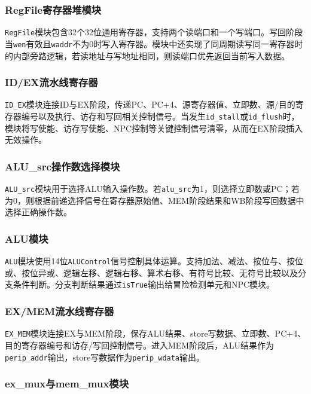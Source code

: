 \documentclass[UTF8,a4paper,12pt]{ctexart}
\newcommand{\code}[1]{\texttt{#1}}
\begin{document}
\subsubsection{RegFile寄存器堆模块}

\code{RegFile}模块包含32个32位通用寄存器，支持两个读端口和一个写端口。写回阶段当\code{wen}有效且\code{waddr}不为0时写入寄存器。模块中还实现了同周期读写同一寄存器时的内部旁路逻辑，若读地址与写地址相同，则读端口优先返回当前写入数据。

\subsubsection{ID/EX流水线寄存器}

\code{ID\_EX}模块连接ID与EX阶段，传递PC、PC+4、源寄存器值、立即数、源/目的寄存器编号以及执行、访存和写回相关控制信号。当发生\code{id\_stall}或\code{id\_flush}时，模块将写使能、访存写使能、NPC控制等关键控制信号清零，从而在EX阶段插入无效操作。

\subsubsection{ALU\_src操作数选择模块}

\code{ALU\_src}模块用于选择ALU输入操作数。若\code{alu\_src}为1，则选择立即数或PC；若为0，则根据前递选择信号在寄存器原始值、MEM阶段结果和WB阶段写回数据中选择正确操作数。

\subsubsection{ALU模块}

\code{ALU}模块使用14位\code{ALUControl}信号控制具体运算。支持加法、减法、按位与、按位或、按位异或、逻辑左移、逻辑右移、算术右移、有符号比较、无符号比较以及分支条件判断。分支判断结果通过\code{isTrue}输出给冒险检测单元和NPC模块。

\subsubsection{EX/MEM流水线寄存器}

\code{EX\_MEM}模块连接EX与MEM阶段，保存ALU结果、store写数据、立即数、PC+4、目的寄存器编号和访存/写回控制信号。进入MEM阶段后，ALU结果作为\code{perip\_addr}输出，store写数据作为\code{perip\_wdata}输出。

\subsubsection{ex\_mux与mem\_mux模块}
\end{document}
